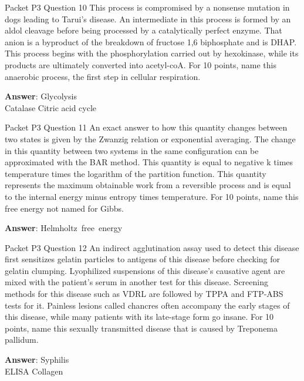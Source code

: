 \begin{frame}{Packet P3 Question 10}
This process is compromised by a nonsense mutation in dogs leading to Tarui's disease. An intermediate in this process is formed by an aldol cleavage before being processed by a catalytically perfect enzyme.   That anion is a byproduct of the breakdown of fructose   1,6 biphosphate and is DHAP. This process   begins with the phosphorylation carried   out by hexokinase, while its products are ultimately converted into acetyl-coA. For 10 points, name this anaerobic process, the first step in cellular respiration.  

\textbf{Answer}: Glycolysis\\
 Catalase
 Citric acid cycle
\end{frame}

\begin{frame}{Packet P3 Question 11}
An exact answer to how this quantity changes between two states is given by the Zwanzig relation or exponential averaging. The change in this quantity between two systems in the same configuration can be approximated with the BAR method. This quantity is equal to negative k times temperature times the logarithm of the partition function. This     quantity represents the maximum obtainable work from a reversible   process and   is equal to the internal energy minus entropy times temperature. For 10 points, name this free energy not named for Gibbs.

\textbf{Answer}: Helmholtz\ free\ energy\\
\end{frame}

\begin{frame}{Packet P3 Question 12}
An indirect agglutination assay used to detect   this disease first sensitizes gelatin particles to antigens of this disease before checking for gelatin clumping. Lyophilized   suspensions of this disease's causative agent are mixed with the patient's serum in another test for this disease. Screening methods for this disease such as VDRL are followed   by TPPA and FTP-ABS tests for it. Painless lesions called   chancres often   accompany the early stages of this disease, while many patients with its late-stage form go insane. For 10 points, name this sexually transmitted disease that is   caused by Treponema pallidum.

\textbf{Answer}: Syphilis\\
 ELISA
 Collagen
\end{frame}

